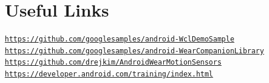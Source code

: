 \section*{Useful Links}

\href{https://github.com/googlesamples/android-WclDemoSample}{\tt https\+://github.\+com/googlesamples/android-\/\+Wcl\+Demo\+Sample} ~\newline
 \href{https://github.com/googlesamples/android-WearCompanionLibrary}{\tt https\+://github.\+com/googlesamples/android-\/\+Wear\+Companion\+Library} ~\newline
 \href{https://github.com/drejkim/AndroidWearMotionSensors}{\tt https\+://github.\+com/drejkim/\+Android\+Wear\+Motion\+Sensors} ~\newline
 \href{https://developer.android.com/training/index.html}{\tt https\+://developer.\+android.\+com/training/index.\+html} ~\newline
 
